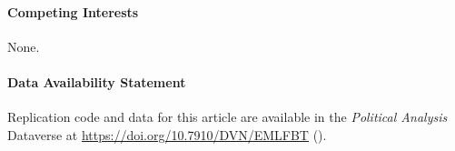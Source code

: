 \documentclass[12pt]{article}
\begin{document}
\paragraph{Competing Interests}
None.

\paragraph{Data Availability Statement}
Replication code and data for this article are available in the \emph{Political Analysis} Dataverse at \url{https://doi.org/10.7910/DVN/EMLFBT} (\citealt{Rainey2026data}).

\printbibliography

\end{document}
